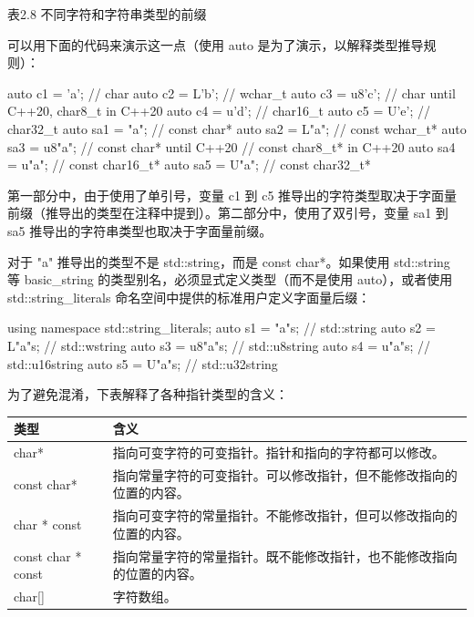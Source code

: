 \begin{center}
表2.8 不同字符和字符串类型的前缀
\end{center}

可以用下面的代码来演示这一点（使用 auto 是为了演示，以解释类型推导规则）：

\begin{cpp}
auto c1 = 'a';     // char
auto c2 = L'b';    // wchar_t
auto c3 = u8'c';   // char until C++20, char8_t in C++20
auto c4 = u'd';    // char16_t
auto c5 = U'e';    // char32_t
auto sa1 = "a";    // const char*
auto sa2 = L"a";   // const wchar_t*
auto sa3 = u8"a";  // const char* until C++20
// const char8_t* in C++20
auto sa4 = u"a";   // const char16_t*
auto sa5 = U"a";   // const char32_t*
\end{cpp}

第一部分中，由于使用了单引号，变量 c1 到 c5 推导出的字符类型取决于字面量前缀（推导出的类型在注释中提到）。第二部分中，使用了双引号，变量 sa1 到 sa5 推导出的字符串类型也取决于字面量前缀。

对于 "a" 推导出的类型不是 std::string，而是 const char*。如果使用 std::string 等 basic\_string 的类型别名，必须显式定义类型（而不是使用 auto），或者使用 std::string\_literals 命名空间中提供的标准用户定义字面量后缀：

\begin{cpp}
using namespace std::string_literals;
auto s1 = "a"s;    // std::string
auto s2 = L"a"s;   // std::wstring
auto s3 = u8"a"s;  // std::u8string
auto s4 = u"a"s;   // std::u16string
auto s5 = U"a"s;   // std::u32string
\end{cpp}

为了避免混淆，下表解释了各种指针类型的含义：

\begin{longtable}{|l|l|}
\hline
\textbf{类型} & \textbf{含义}        \\ \hline
\endfirsthead
%
\endhead
%
char*              & 指向可变字符的可变指针。指针和指向的字符都可以修改。                           \\ \hline
const char*        & 指向常量字符的可变指针。可以修改指针，但不能修改指向的位置的内容。       \\ \hline
char * const       & 指向可变字符的常量指针。不能修改指针，但可以修改指向的位置的内容。 \\ \hline
const char * const &指向常量字符的常量指针。既不能修改指针，也不能修改指向的位置的内容。   \\ \hline
char{[}{]}    & 字符数组。 \\ \hline
\end{longtable}

